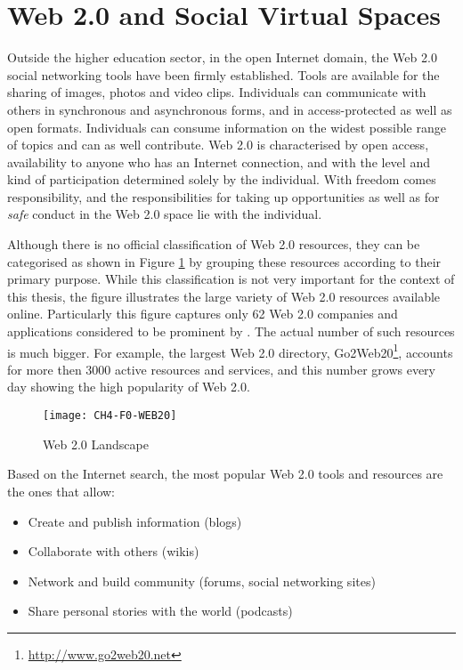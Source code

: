 \section{Web 2.0 and Social Virtual Spaces}
Outside the higher education sector, in the open Internet domain, the Web 2.0
social networking tools have been firmly established. Tools are available for
the sharing of images, photos and video clips. Individuals can communicate with
others in synchronous and asynchronous forms, and in access-protected as well as
open formats. Individuals can consume information on the widest possible range
of topics and can as well contribute. Web 2.0 is characterised by open access,
availability to anyone who has an Internet connection, and with the level and
kind of participation determined solely by the individual. With freedom comes
responsibility, and the responsibilities for taking up opportunities as well as
for \textit{safe} conduct in the Web 2.0 space lie with the individual.

Although there is no official classification of Web 2.0 resources, they can be
categorised as shown in Figure \ref{fig:web20l} by grouping these resources
according to their primary purpose. While this classification is not very
important for the context of this thesis, the figure illustrates the large
variety of Web 2.0 resources available online. Particularly this figure captures
only 62 Web 2.0 companies and applications considered to be prominent by
\citet{Dawson2007}. The actual number of such resources is much bigger. For
example, the largest Web 2.0 directory,
Go2Web20\footnote{\url{http://www.go2web20.net}}, accounts for more then 3000
active resources and services, and this number grows every day showing the high
popularity of Web 2.0.

\begin{figure}[htb]
\centering
\texttt{[image: CH4-F0-WEB20]}
\caption[Web 2.0 Landscape]{Web 2.0 Landscape \citep{Dawson2007}}
\label{fig:web20l}
\end{figure}

Based on the Internet search, the most popular Web 2.0 tools and resources are
the ones that allow:

\begin{itemize}
  \item Create and publish information (blogs)
  \item Collaborate with others (wikis)
  \item Network and build community (forums, social networking sites)
  \item Share personal stories with the world (podcasts)
\end{itemize}

